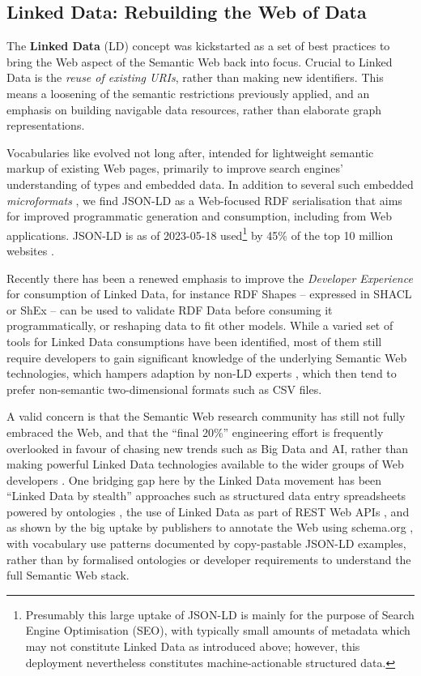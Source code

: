 \subsection{Linked Data: Rebuilding the Web of Data}\label{ch3:ld-web}

The \textbf{Linked Data} (LD) concept \cite{Bizer 2009} was kickstarted as a set of best practices \cite{Berners-Lee 2006} to bring the Web aspect of the Semantic Web back into focus. Crucial to Linked Data is the \emph{reuse of existing URIs}, rather than making new identifiers. This means a loosening of the semantic restrictions previously applied, and an emphasis on building navigable data resources, rather than elaborate graph representations.

Vocabularies like  evolved not long after, intended for lightweight semantic markup of existing Web pages, primarily to improve search engines' understanding of types and embedded data. In addition to several such embedded \emph{microformats} \cite{Open Graph,Sporny 2015,WHATWG 2023}, we find JSON-LD \cite{Sporny 2020} as a Web-focused RDF serialisation that aims for improved programmatic generation and consumption, including from Web applications. JSON-LD is as of 2023-05-18 used\footnote{Presumably this large uptake of JSON-LD is mainly for the purpose of Search Engine Optimisation (SEO), with typically small amounts of metadata which may not constitute Linked Data as introduced above; however, this deployment nevertheless constitutes machine-actionable structured data.} by 45\% of the top 10 million websites \cite{W3Techs 2023}.

Recently there has been a renewed emphasis to improve the \emph{Developer Experience} \cite{Verborgh 2018} for consumption of Linked Data, for instance RDF Shapes -- expressed in SHACL \cite{Kontokostas 2017} or ShEx \cite{Baker 2019} -- can be used to validate RDF Data \cite{Labra Gayo 2017,Thornton 2019} before consuming it programmatically, or reshaping data to fit other models. While a varied set of tools for Linked Data consumptions have been identified, most of them still require developers to gain significant knowledge of the underlying Semantic Web technologies, which hampers adaption by non-LD experts \cite{Klímek 2019}, which then tend to prefer non-semantic two-dimensional formats such as CSV files.

A valid concern is that the Semantic Web research community has still not fully embraced the Web, and that the ``final 20\%'' engineering effort is frequently overlooked in favour of chasing new trends such as Big Data and AI, rather than making powerful Linked Data technologies available to the wider groups of Web developers \cite{Verborgh 2020}. One bridging gap here by the Linked Data movement has been ``Linked Data by stealth'' approaches such as structured data entry spreadsheets powered by ontologies \cite{Wolstencroft 2011}, the use of Linked Data as part of REST Web APIs \cite{Page 2011}, and as shown by the big uptake by publishers to annotate the Web using schema.org \cite{Bernstein 2016}, with vocabulary use patterns documented by copy-pastable JSON-LD examples, rather than by formalised ontologies or developer requirements to understand the full Semantic Web stack.

